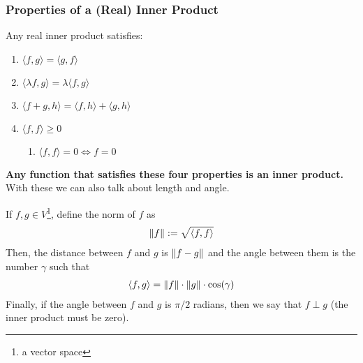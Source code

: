 \subsubsection{Properties of a (Real) Inner Product}
\begin{definition}
    Any real inner product satisfies:
    \begin{enumerate}
        \item $\langle f, g \rangle = \langle g, f \rangle$
        \item $\langle \lambda f, g \rangle = \lambda \langle f, g \rangle$
        \item $\langle f + g, h \rangle = \langle f, h \rangle + \langle g, h \rangle$
        \item $\langle f, f \rangle \ge 0$
        \begin{enumerate}
            \item $\langle f, f \rangle = 0 \iff f = 0$
        \end{enumerate}
    \end{enumerate}
\end{definition}
\textbf{Any function that satisfies these four properties is an inner product.} With these we can also talk about length and angle.
\begin{definition}
    If $f, g \in V$\footnote{a vector space}, define the norm of $f$ as
    \begin{align}
        \norm{f} := \sqrt{\langle f, f \rangle}
     \end{align}
     Then, the distance between $f$ and $g$ is $\norm{f-g}$ and the angle between them is the number $\gamma$ such that
     \begin{align}
         \langle f, g \rangle = \norm{f} \cdot \norm{g} \cdot \cos(\gamma)
     \end{align}
     Finally, if the angle between $f$ and $g$ is $\pi/2$ radians, then we say that $f \perp g$ (the inner product must be zero).
\end{definition}